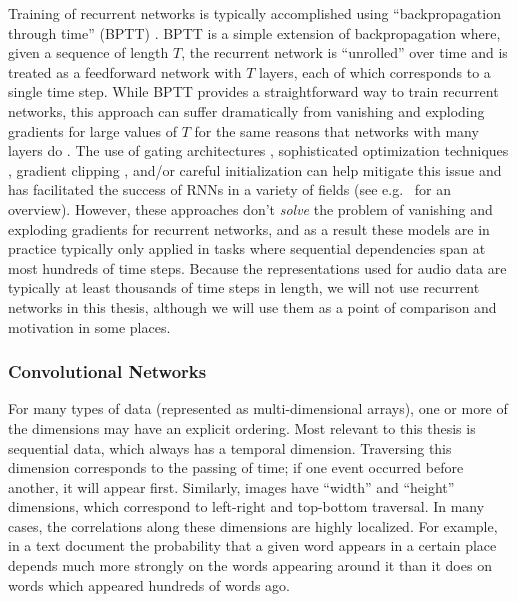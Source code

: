 Training of recurrent networks is typically accomplished using ``backpropagation through time'' (BPTT) \cite{werbos1990backpropagation}.
BPTT is a simple extension of backpropagation where, given a sequence of length $T$, the recurrent network is ``unrolled'' over time and is treated as a feedforward network with $T$ layers, each of which corresponds to a single time step.
While BPTT provides a straightforward way to train recurrent networks, this approach can suffer dramatically from vanishing and exploding gradients for large values of $T$ for the same reasons that networks with many layers do \cite{bengio1994learning,hochreiter1997long,pascanu2013difficulty}.
The use of gating architectures \cite{hochreiter1997long,cho2014learning}, sophisticated optimization techniques \cite{martens2011learning,sutskever2013importance}, gradient clipping \cite{pascanu2013difficulty,graves2013generating}, and/or careful initialization \cite{sutskever2013importance,jaegar2012long,mikolov2014learning,le2015simple} can help mitigate this issue and has facilitated the success of RNNs in a variety of fields (see e.g.\ \cite{graves2012supervised} for an overview).
However, these approaches don't {\em solve} the problem of vanishing and exploding gradients for recurrent networks, and as a result these models are in practice typically only applied in tasks where sequential dependencies span at most hundreds of time steps.
Because the representations used for audio data are typically at least thousands of time steps in length, we will not use recurrent networks in this thesis, although we will use them as a point of comparison and motivation in some places.

\subsubsection{Convolutional Networks}
\label{sec:convolutional_networks}

For many types of data (represented as multi-dimensional arrays), one or more of the dimensions may have an explicit ordering.
Most relevant to this thesis is sequential data, which always has a temporal dimension.
Traversing this dimension corresponds to the passing of time; if one event occurred before another, it will appear first.
Similarly, images have ``width'' and ``height'' dimensions, which correspond to left-right and top-bottom traversal.
In many cases, the correlations along these dimensions are highly localized.
For example, in a text document the probability that a given word appears in a certain place depends much more strongly on the words appearing around it than it does on words which appeared hundreds of words ago.

